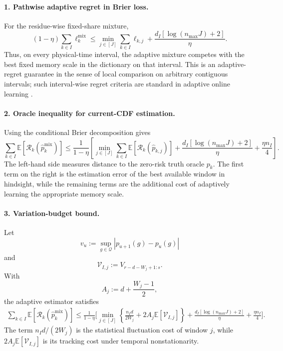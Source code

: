 \documentclass[11pt]{article}
\newcommand{\E}{\mathbb{E}}
\newcommand{\Q}{\mathcal{Q}}
\newcommand{\1}{\mathbf{1}}
\begin{document}
\paragraph{1. Pathwise adaptive regret in Brier loss.}
For the residue-wise fixed-share mixture,
\[
\boxed{
    (1-\eta)
    \sum_{k\in I}
    \ell_k^{\mathrm{mix}}
    \le
    \min_{j\in[J]}
    \sum_{k\in I}
    \ell_{k,j}
    +
    \frac{
        d_I[\log(n_{\max}J)+2]
    }{\eta}.
}
\]
Thus, on every physical-time interval, the adaptive mixture competes with the
best fixed memory scale in the dictionary on that interval.  This is an
adaptive-regret guarantee in the sense of local comparison on arbitrary
contiguous intervals; such interval-wise regret criteria are standard in
adaptive online learning
\cite{herbster1998,hazan2009,gradu2023}.

\paragraph{2. Oracle inequality for current-CDF estimation.}
Using the conditional Brier decomposition gives
\[
\boxed{
    \sum_{k\in I}
    \E\!\left[
        \mathcal R_k(\widehat p_k^{\mathrm{mix}})
    \right]
    \le
    \frac1{1-\eta}
    \left[
        \min_{j\in[J]}
        \sum_{k\in I}
        \E\!\left[
            \mathcal R_k(\widehat p_{k,j})
        \right]
        +
        \frac{
            d_I[\log(n_{\max}J)+2]
        }{\eta}
        +
        \frac{\eta n_I}{4}
    \right].
}
\]
The left-hand side measures distance to the zero-risk truth oracle $p_k$.
The first term on the right is the estimation error of the best available
window in hindsight, while the remaining terms are the additional cost of
adaptively learning the appropriate memory scale.

\paragraph{3. Variation-budget bound.}
Let
\[
    v_u
    :=
    \sup_{g\in\Q}
    |p_{u+1}(g)-p_u(g)|
\]
and
\[
    \mathcal V_{I,j}
    :=
    V_{r-d-W_j+1:s}.
\]
With
\[
    A_j
    :=
    d+\frac{W_j-1}{2},
\]
the adaptive estimator satisfies
\[
\boxed{
\begin{aligned}
    \sum_{k\in I}
    \E\!\left[
        \mathcal R_k(\widehat p_k^{\mathrm{mix}})
    \right]
    \le
    \frac1{1-\eta}
    \Bigg[
        \min_{j\in[J]}
        \left\{
            \frac{n_I d}{2W_j}
            +
            2A_j\E[\mathcal V_{I,j}]
        \right\}
        +
        \frac{
            d_I[\log(n_{\max}J)+2]
        }{\eta}
        +
        \frac{\eta n_I}{4}
    \Bigg].
\end{aligned}
}
\]
The term $n_Id/(2W_j)$ is the statistical fluctuation cost of window $j$,
while $2A_j\E[\mathcal V_{I,j}]$ is its tracking cost under temporal
nonstationarity.
\end{document}
